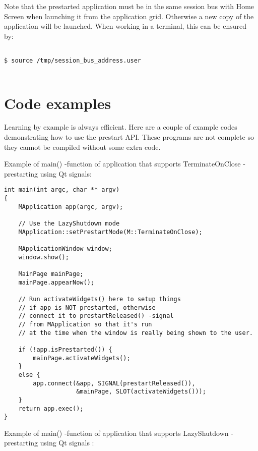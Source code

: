 \documentclass[a4paper]{article}
\begin{document}
Note that the prestarted application must be in the same session bus with Home Screen when launching it from the application grid. Otherwise a new copy of the application will be launched. When working in a terminal, this can be ensured by:

\begin{verbatim}

$ source /tmp/session_bus_address.user
 
\end{verbatim}

\section{Code examples}

Learning by example is always efficient. Here are a couple of example codes demonstrating how to use the prestart API. These programs are not complete so they cannot be compiled without some extra code. 

Example of main() -function of application that supports TerminateOnClose -prestarting using Qt signals:

\begin{verbatim}
int main(int argc, char ** argv)
{
    MApplication app(argc, argv);

    // Use the LazyShutdown mode
    MApplication::setPrestartMode(M::TerminateOnClose);

    MApplicationWindow window;
    window.show();

    MainPage mainPage;
    mainPage.appearNow();

    // Run activateWidgets() here to setup things 
    // if app is NOT prestarted, otherwise
    // connect it to prestartReleased() -signal 
    // from MApplication so that it's run
    // at the time when the window is really being shown to the user.

    if (!app.isPrestarted()) {
        mainPage.activateWidgets();
    }
    else {
        app.connect(&app, SIGNAL(prestartReleased()), 
                    &mainPage, SLOT(activateWidgets()));
    }
    return app.exec();
}
\end{verbatim}

Example of main() -function of application that supports LazyShutdown -prestarting using Qt signals :
\end{document}

